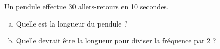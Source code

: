 %
%
    Un pendule effectue 30 allers-retours en 10 secondes.
    \begin{enumerate}[a)]
        \item Quelle est la longueur du pendule ?
        \item Quelle devrait être la longueur pour diviser la fréquence par 2 ?
    \end{enumerate}
